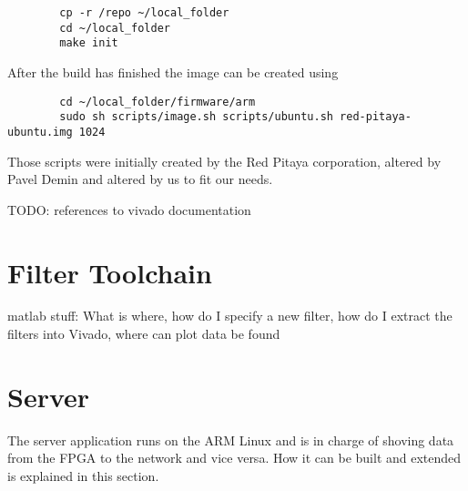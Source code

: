 \begin{listing}
    \begin{verbatim}
        cp -r /repo ~/local_folder
        cd ~/local_folder
        make init
    \end{verbatim}
\end{listing}

After the build has finished the image can be created using

\begin{listing}
    \begin{verbatim}
        cd ~/local_folder/firmware/arm
        sudo sh scripts/image.sh scripts/ubuntu.sh red-pitaya-ubuntu.img 1024
    \end{verbatim}
\end{listing}

Those scripts were initially created by the Red Pitaya corporation, altered by
Pavel Demin\cite{TODO:} and altered by us to fit our needs.

TODO: references to vivado documentation
%
%
\chapter{Filter Toolchain} %
\label{ch:devguide:fpga_toolchain}
matlab stuff: What is where,  how do I specify a new filter,  how do I extract
the filters into Vivado, where can plot data be found
%
%
\chapter{Server} %
\label{ch:devguide:server}

The server application runs on the ARM  Linux and is in charge of shoving data
from the FPGA to the network and vice versa.
How it can be built and extended is explained in this section.

